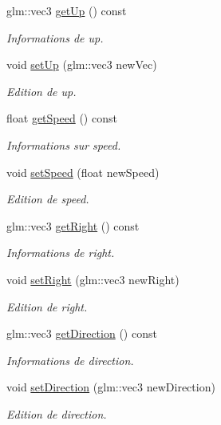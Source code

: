 \begin{DoxyCompactItemize}
glm\+::vec3 \hyperlink{classglimac_1_1Controls_a7b4c48586aef21ae566fc8d60e69d220}{get\+Up} () const
\begin{DoxyCompactList}\small\item\em Informations de up. \end{DoxyCompactList}\item 
void \hyperlink{classglimac_1_1Controls_aa9d4839c153b46efa419af8599d07d7b}{set\+Up} (glm\+::vec3 new\+Vec)
\begin{DoxyCompactList}\small\item\em Edition de up. \end{DoxyCompactList}\item 
float \hyperlink{classglimac_1_1Controls_ae6169e82a96b77cff9b578d6ed7afab0}{get\+Speed} () const
\begin{DoxyCompactList}\small\item\em Informations sur speed. \end{DoxyCompactList}\item 
void \hyperlink{classglimac_1_1Controls_abdd360d577810fddb2f01a96dc5baacc}{set\+Speed} (float new\+Speed)
\begin{DoxyCompactList}\small\item\em Edition de speed. \end{DoxyCompactList}\item 
glm\+::vec3 \hyperlink{classglimac_1_1Controls_ab14c0edc3850dcefe38bdd4e6cfd4188}{get\+Right} () const
\begin{DoxyCompactList}\small\item\em Informations de right. \end{DoxyCompactList}\item 
void \hyperlink{classglimac_1_1Controls_ae42a699a28d327cd7c9e1d01e78ae693}{set\+Right} (glm\+::vec3 new\+Right)
\begin{DoxyCompactList}\small\item\em Edition de right. \end{DoxyCompactList}\item 
glm\+::vec3 \hyperlink{classglimac_1_1Controls_ac81c1ccf8bf86916d6dc02d24dc2560a}{get\+Direction} () const
\begin{DoxyCompactList}\small\item\em Informations de direction. \end{DoxyCompactList}\item 
void \hyperlink{classglimac_1_1Controls_aeecf9a01133bdfa844e6282437601a00}{set\+Direction} (glm\+::vec3 new\+Direction)
\begin{DoxyCompactList}\small\item\em Edition de direction. \end{DoxyCompactList}\end{DoxyCompactItemize}


